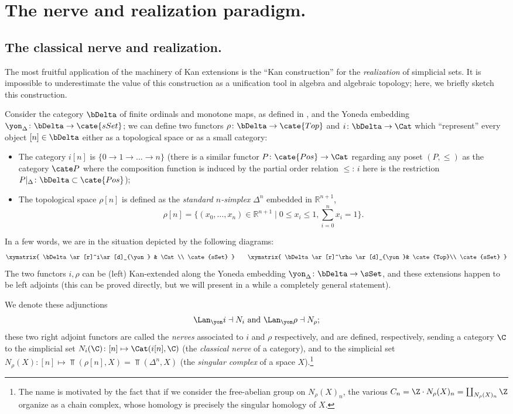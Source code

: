 \section{The nerve and realization paradigm.}\label{section:nr}
\subsection{The classical nerve and realization.}
The most fruitful application of the machinery of Kan extensions is the ``Kan construction'' for the \emph{realization} of simplicial sets. It is impossible to underestimate the value of this construction as a unification tool in algebra and algebraic topology; here, we briefly sketch this construction. 

Consider the category $\bDelta$ of finite ordinals and monotone maps, as  defined in \cite{GoJ}, and the Yoneda embedding $\yon_\Delta \colon \bDelta \to \cate{sSet}$; we can define two  functors $\rho\colon \bDelta\to \cate{Top}$ and $i\colon \bDelta\to \Cat$ which ``represent'' every object $[n]\in\bDelta$ either as a topological space or as a small category:
\begin{itemize}
\item The category $i[n]$ is $\{0\to 1\to\dots\to n\}$ (there is a similar functor $P \colon \cate{Pos}\to \Cat$ regarding any poset $(P,\le)$ as the category $\cate P$ where the composition function is induced by the partial order relation $\le$: $i$ here is the restriction $P|_\Delta \colon \bDelta\subset \cate{Pos}$);
\item The topological space $\rho[n]$ is defined as the \emph{standard $n$-simplex} $\Delta^n$ embedded in $\mathbb{R}^{n+1}$, 
\[
\rho[n] = \Big\{(x_0, \dots, x_n) \in \mathbb{R}^{n+1} \mid 0\leq x_i \leq 1, \textstyle \sum_{i=0}^n x_i = 1 \Big\}.
\]
\end{itemize}
In a few words, we are in the situation depicted by the following diagrams:
\[
\xymatrix{
\bDelta \ar[r]^i\ar[d]_{\yon } & \Cat \\
\cate{sSet}
}\qquad 
\xymatrix{
\bDelta \ar[r]^\rho\ar[d]_{\yon }& \cate{Top}\\
\cate{sSet}
}
\]
The two functors $i,\rho$ can be (left) Kan-extended along the Yoneda embedding $\yon_\Delta\colon \bDelta \to \sSet$, and these extensions happen to be left adjoints (this can be proved directly, but we will present in a while a completely general statement).

We denote these adjunctions
\[
\Lan_\yon i\dashv N_i \text{ and } \Lan_\yon \rho\dashv N_\rho;
\] 
these two right adjoint functors are called the \emph{nerves} associated to $i$ and $\rho$ respectively, and are defined, respectively, sending a category $\C$ to the simplicial set $N_i(\C)\colon [n]\mapsto \Cat(i[n],\C)$ (the \emph{classical nerve} of a category), and to the simplicial set $N_\rho(X)\colon[n]\mapsto \Top(\rho[n], X) = \Top(\Delta^n, X)$ (the \emph{singular complex} of a space $X$).\footnote{The name is motivated by the fact that if we consider the free-abelian group on $N_\rho(X)_n$, the various $C_n = \Z\cdot N_\rho(X)_n = \coprod_{ N_\rho(X)_n}\Z$ organize as a chain complex, whose homology is precisely the singular homology of $X$.}

